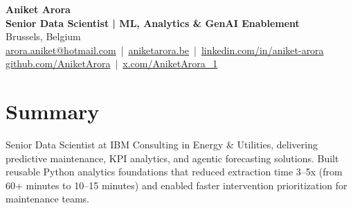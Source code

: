 \documentclass[10pt,a4paper]{article}
\begin{document}
\raggedright
{\Huge\textbf{Aniket Arora}}\\
\textbf{Senior Data Scientist | ML, Analytics \& GenAI Enablement}\\
Brussels, Belgium\\
\href{mailto:arora.aniket@hotmail.com}{arora.aniket@hotmail.com} \,|\, \href{https://aniketarora.be}{aniketarora.be} \,|\, \href{https://www.linkedin.com/in/aniket-arora/}{linkedin.com/in/aniket-arora}\\
\href{https://github.com/AniketArora}{github.com/AniketArora} \,|\, \href{https://x.com/AniketArora_1}{x.com/AniketArora\_1}

\section*{Summary}
Senior Data Scientist at IBM Consulting in Energy \& Utilities, delivering predictive maintenance, KPI analytics, and agentic forecasting solutions. Built reusable Python analytics foundations that reduced extraction time 3--5x (from 60+ minutes to 10--15 minutes) and enabled faster intervention prioritization for maintenance teams.
\end{document}
